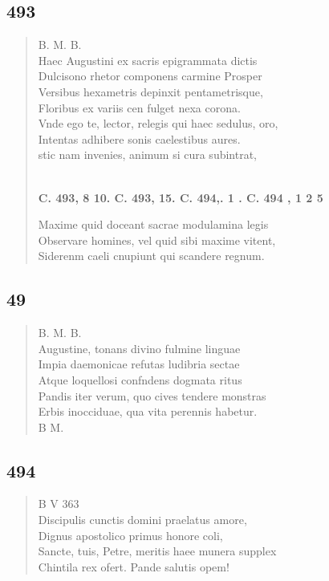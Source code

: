 \documentclass[11pt, a4paper]{report}
\begin{document}
            \subsection*{493}
      \begin{verse}
      B. M. B. \\ Haec Augustini ex sacris epigrammata dictis \\ Dulcisono rhetor componens carmine Prosper \\ Versibus hexametris depinxit pentametrisque, \\ Floribus ex variis cen fulget nexa corona. \\ Vnde ego te, lector, relegis qui haec sedulus, oro, \\ Intentas adhibere sonis caelestibus aures. \\ stic nam invenies, animum si cura subintrat, \\ 
        ﻿\pagebreak 
    \begin{center} \textbf{C. 493, 8 10. C. 493, 15. C. 494,. 1 . C. 494 , 1 2 5} \end{center}Maxime quid doceant sacrae modulamina legis \\ Observare homines, vel quid sibi maxime vitent, \\ Siderenm caeli cnupiunt qui scandere regnum. \\ 
      \end{verse}
  
            \subsection*{49}
      \begin{verse}
      B. M. B. \\ Augustine, tonans divino fulmine linguae \\ Impia daemonicae refutas ludibria sectae \\ Atque loquellosi confndens dogmata ritus \\ Pandis iter verum, quo cives tendere monstras \\ Erbis inocciduae, qua vita perennis habetur. \\ B M. \\ 
      \end{verse}
  
            \subsection*{494}
      \begin{verse}
      B V 363 \\ Discipulis cunctis domini praelatus amore, \\ Dignus apostolico primus honore coli, \\ Sancte, tuis, Petre, meritis haee munera supplex \\ Chintila rex ofert. Pande salutis opem! \\ 
      \end{verse}
  
\end{document}
